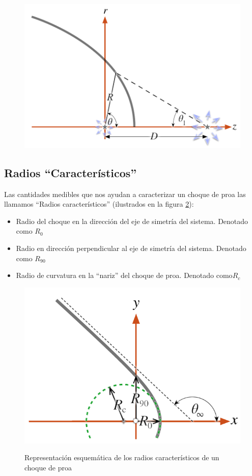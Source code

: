 \begin{figure}
  \includegraphics[width=0.5\linewidth]{./Figures/bowshock-crw-variables}
  \label{fig:crw-esquema}
\end{figure}

\subsection{Radios ``Característicos''}

Las cantidades medibles que nos ayudan a caracterizar un choque de proa las
llamamos ``Radios característicos'' (ilustrados en la figura
\ref{fig:char-radii}):
\begin{itemize}
\item Radio del choque en la dirección del eje de simetría del sistema.
  Denotado como $R_0$
\item Radio en dirección perpendicular al eje de simetría del sistema.
  Denotado como $R_{90}$
\item Radio de curvatura en la ``nariz'' del choque de proa. Denotado
  como$ R_c$
\end{itemize}

\begin{figure}
  \includegraphics[width=\linewidth]{./Figures/characteristic-radii}
  \label{fig:char-radii}
  \caption{Representación esquemática de los radios característicos
  de un choque de proa}
\end{figure}

